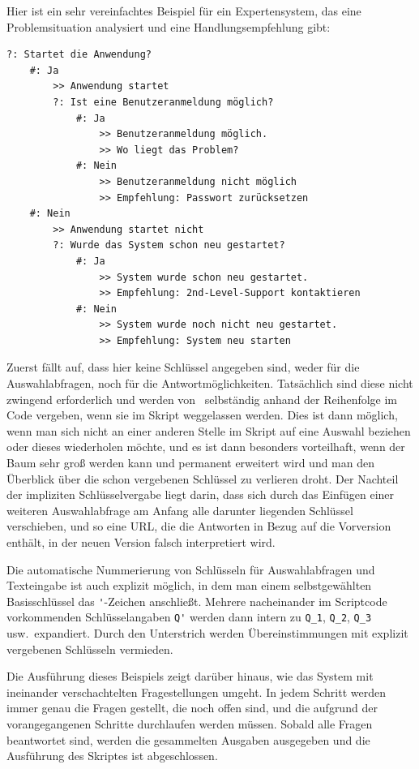 Hier ist ein sehr vereinfachtes Beispiel für ein Expertensystem, das eine Problemsituation analysiert und eine Handlungsempfehlung gibt:
\label{Bsp04}
\begin{verbatim}
?: Startet die Anwendung?
    #: Ja
        >> Anwendung startet
        ?: Ist eine Benutzeranmeldung möglich?
            #: Ja
                >> Benutzeranmeldung möglich.
                >> Wo liegt das Problem?
            #: Nein
                >> Benutzeranmeldung nicht möglich
                >> Empfehlung: Passwort zurücksetzen
    #: Nein
        >> Anwendung startet nicht
        ?: Wurde das System schon neu gestartet?
            #: Ja
                >> System wurde schon neu gestartet.
                >> Empfehlung: 2nd-Level-Support kontaktieren
            #: Nein
                >> System wurde noch nicht neu gestartet.
                >> Empfehlung: System neu starten
\end{verbatim}

Zuerst fällt auf, dass hier keine Schlüssel angegeben sind, weder für die Auswahlabfragen, noch für die Antwortmöglichkeiten. Tatsächlich sind diese nicht zwingend erforderlich und werden von \FPZ\ selbständig anhand der Reihenfolge im Code vergeben, wenn sie im Skript weggelassen werden. Dies ist dann möglich, wenn man sich nicht an einer anderen Stelle im Skript auf eine Auswahl beziehen oder dieses wiederholen möchte, und es ist dann besonders vorteilhaft, wenn der Baum sehr groß werden kann und permanent erweitert wird und man den Überblick über die schon vergebenen Schlüssel zu verlieren droht. Der Nachteil der impliziten Schlüsselvergabe liegt darin, dass sich durch das Einfügen einer weiteren Auswahlabfrage am Anfang alle darunter liegenden Schlüssel verschieben, und so eine URL, die die Antworten in Bezug auf die Vorversion enthält, in der neuen Version falsch interpretiert wird. 

Die automatische Nummerierung von Schlüsseln für Auswahlabfragen und Texteingabe ist auch explizit möglich, in dem man einem selbstgewählten Basisschlüssel das \verb|'|-Zeichen anschließt. Mehrere nacheinander im Scriptcode vorkommenden Schlüsselangaben \verb|Q'| werden dann intern zu \verb|Q_1|, \verb|Q_2|, \verb|Q_3| usw.\ expandiert. Durch den Unterstrich werden Übereinstimmungen mit explizit vergebenen Schlüsseln vermieden.

Die Ausführung dieses Beispiels zeigt darüber hinaus, wie das System mit ineinander verschachtelten Fragestellungen umgeht. In jedem Schritt werden immer genau die Fragen gestellt, die noch offen sind, und die aufgrund der vorangegangenen Schritte durchlaufen werden müssen. Sobald alle Fragen beantwortet sind, werden die gesammelten Ausgaben ausgegeben und die Ausführung des Skriptes ist abgeschlossen.

